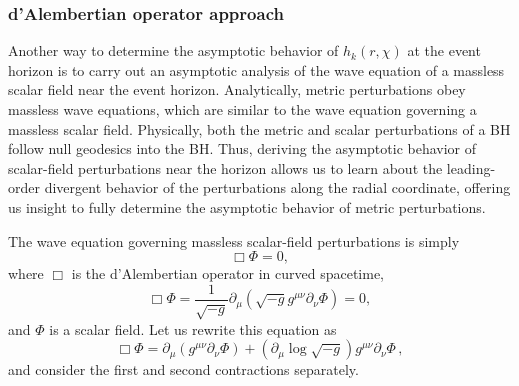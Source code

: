 \documentclass[aps,prx,amsmath,floats,floatfix,twocolumn,
  superscriptaddress,nofootinbib,showpacs]{revtex4-1}
\begin{document}
\subsubsection{d'Alembertian operator approach}

Another way to determine the asymptotic behavior of $h_k(r, \chi) $ at the event horizon is to carry out an asymptotic analysis of the wave equation of a massless scalar field near the event horizon. 
Analytically, metric perturbations obey massless wave equations, which are similar to the wave equation governing a massless scalar field. 
Physically, both the metric and scalar perturbations of a BH follow null geodesics into the BH. 
Thus, deriving the asymptotic behavior of scalar-field perturbations near the horizon allows us to learn about the leading-order divergent behavior of the perturbations along the radial coordinate, offering us insight to fully determine the asymptotic behavior of metric perturbations. 

The wave equation governing massless scalar-field perturbations is simply
\begin{equation}
\Box \Phi = 0, 
\end{equation}
where $\Box$ is the d'Alembertian operator in curved spacetime, 
\begin{equation}
\Box \Phi = \frac{1}{\sqrt{-g}} \partial_{\mu} \left( \sqrt{-g} g^{\mu \nu} \partial_{\nu} \Phi \right) = 0,  
\end{equation}
and $\Phi$ is a scalar field. 
Let us rewrite this equation as 
\begin{equation}
\Box \Phi = \partial_{\mu} \left( g^{\mu \nu}  \partial_{\nu} \Phi \right) + \left( \partial_{\mu} \log \sqrt{-g} \right) g^{\mu \nu} \partial_{\nu} \Phi\,,
\label{Boxeq-new-rewrite}
\end{equation}
and consider the first and second contractions separately. 
\end{document}
